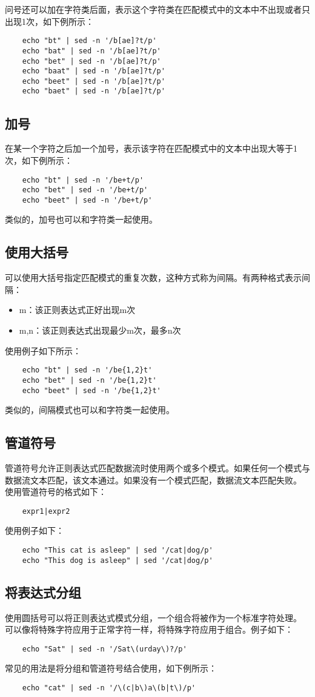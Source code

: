 \documentclass[a4paper,left=1.5cm,right=1.5cm,11pt]{article}
\begin{document}
	问号还可以加在字符类后面，表示这个字符类在匹配模式中的文本中不出现或者只出现1次，如下例所示：
	\begin{lstlisting}
	echo "bt" | sed -n '/b[ae]?t/p'
	echo "bat" | sed -n '/b[ae]?t/p'
	echo "bet" | sed -n '/b[ae]?t/p'
	echo "baat" | sed -n '/b[ae]?t/p'
	echo "beet" | sed -n '/b[ae]?t/p'
	echo "baet" | sed -n '/b[ae]?t/p'
	\end{lstlisting}

\subsection{加号}
	在某一个字符之后加一个加号，表示该字符在匹配模式中的文本中出现大等于1次，如下例所示：
	\begin{lstlisting}
	echo "bt" | sed -n '/be+t/p'
	echo "bet" | sed -n '/be+t/p'
	echo "beet" | sed -n '/be+t/p'
	\end{lstlisting}

	类似的，加号也可以和字符类一起使用。

\subsection{使用大括号}
	可以使用大括号指定匹配模式的重复次数，这种方式称为间隔。有两种格式表示间隔：
	\begin{itemize}
		\item m：该正则表达式正好出现m次
		\item m,n：该正则表达式出现最少m次，最多n次
	\end{itemize}

	使用例子如下所示：
	\begin{lstlisting}
	echo "bt" | sed -n '/be{1,2}t'
	echo "bet" | sed -n '/be{1,2}t'
	echo "beet" | sed -n '/be{1,2}t'
	\end{lstlisting}

	类似的，间隔模式也可以和字符类一起使用。

\subsection{管道符号}
	管道符号允许正则表达式匹配数据流时使用两个或多个模式。如果任何一个模式与数据流文本匹配，该文本通过。如果没有一个模式匹配，数据流文本匹配失败。
	使用管道符号的格式如下：
	\begin{lstlisting}
	expr1|expr2
	\end{lstlisting}

	使用例子如下：
	\begin{lstlisting}
	echo "This cat is asleep" | sed '/cat|dog/p'
	echo "This dog is asleep" | sed '/cat|dog/p'
	\end{lstlisting}

\subsection{将表达式分组}
	使用圆括号可以将正则表达式模式分组，一个组合将被作为一个标准字符处理。
	可以像将特殊字符应用于正常字符一样，将特殊字符应用于组合。例子如下：
	\begin{lstlisting}
	echo "Sat" | sed -n '/Sat\(urday\)?/p'
	\end{lstlisting}

	常见的用法是将分组和管道符号结合使用，如下例所示：
	\begin{lstlisting}
	echo "cat" | sed -n '/\(c|b\)a\(b|t\)/p'
	\end{lstlisting}
\end{document}

